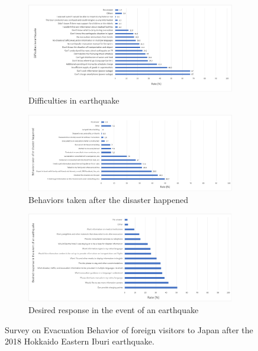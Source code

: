 \begin{figure}[h]
  \begin{subfigure}{\textwidth}
    \includegraphics[width=\linewidth]{Figure/Figure2a.png}
    \caption{Difficulties in earthquake}
    \label{fig2a}
  \end{subfigure}
  \begin{subfigure}{\textwidth}
    \includegraphics[width=\linewidth]{Figure/Figure2b.png}
    \caption{Behaviors taken after the disaster happened}
    \label{fig2b}
  \end{subfigure}
  \begin{subfigure}{\textwidth}
    \includegraphics[width=\linewidth]{Figure/Figure2c.png}
    \caption{Desired response in the event of an earthquake}
    \label{fig2c}
  \end{subfigure}
  \centering
  \caption[Survey on Evacuation Behavior of foreign visitors to Japan after the 2018 Hokkaido Eastern Iburi earthquake.]{Survey on Evacuation Behavior of foreign visitors to Japan after the 2018 Hokkaido Eastern Iburi earthquake.\protect\footnotemark }
  \label{fig2}
\end{figure}
\cleardoublepage

